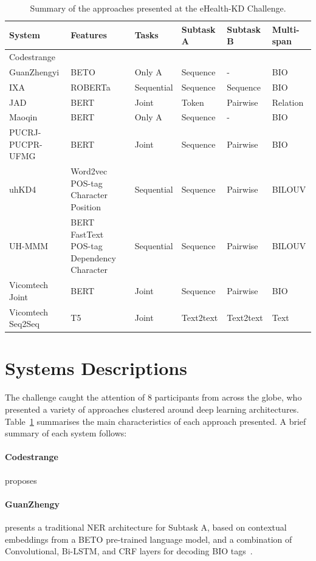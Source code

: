 \documentclass[a4paper,11pt,twocolumn,twoside]{article}
\begin{document}
\begin{table}[t!]
  \centering
  \begin{tabularx}{\textwidth}{lXllll}
    \toprule
    System & Features & Tasks & Subtask A & Subtask B & Multi-span \\
    \midrule
    Codestrange & 				 \\
    GuanZhengyi & BETO & Only A & Sequence & - & BIO \\
    IXA & ROBERTa & Sequential & Sequence & Sequence & BIO \\
    JAD & BERT & Joint & Token & Pairwise & Relation \\
    Maoqin & BERT & Only A & Sequence & - & BIO \\
    PUCRJ-PUCPR-UFMG & BERT & Joint & Sequence & Pairwise & BIO \\
    uhKD4 & Word2vec POS-tag Character Position & Sequential & Sequence & Pairwise & BILOUV \\
    UH-MMM & BERT FastText POS-tag Dependency Character & Sequential & Sequence & Pairwise & BILOUV \\
    Vicomtech Joint & BERT & Joint & Sequence & Pairwise & BIO \\
    Vicomtech Seq2Seq & T5 & Joint & Text2text & Text2text & Text \\
    \bottomrule
  \end{tabularx}
  \caption{Summary of the approaches presented at the eHealth-KD Challenge.\label{tab:participants}}
\end{table}

\section{Systems Descriptions}\label{sec:systems}

The challenge caught the attention of 8 participants from across the globe,
who presented a variety of approaches clustered around deep learning architectures.
Table~\ref{tab:participants} summarises the main characteristics of each approach presented.
A brief summary of each system follows:

  \paragraph{Codestrange} proposes

  \paragraph{GuanZhengy} presents a traditional NER architecture for Subtask A, based on contextual embeddings from a BETO pre-trained language model, and a combination of Convolutional, Bi-LSTM, and CRF layers for decoding BIO tags~\cite{GuanZhengyi2021}.
\end{document}
